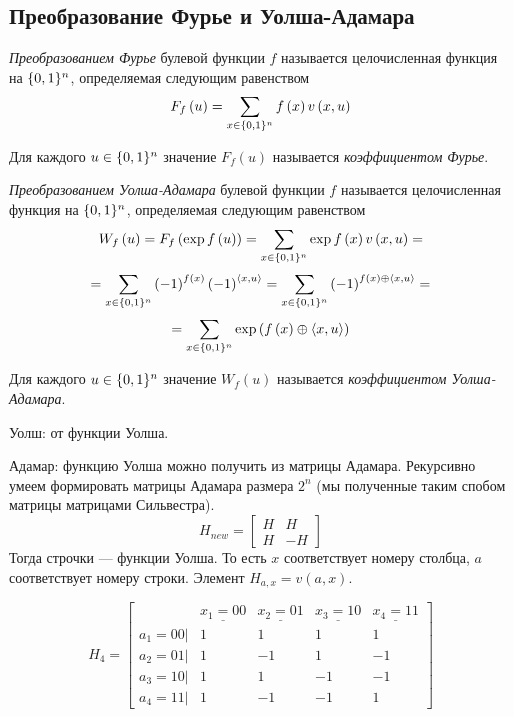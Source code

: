 \subsection{Преобразование Фурье и Уолша-Адамара}
\begin{definition}
\emph{Преобразованием Фурье} булевой функции $f$ называется целочисленная
функция на $\{0,1\}^n$, определяемая следующим равенством
\[
F_{f}\left(u\right)=\sum_{x\in \{0,1\}^n}f\left(x\right)v\left(x,u\right)
\]


Для каждого $u\in \{0,1\}^n$ значение $F_{f}\left(u\right)$ называется
\emph{коэффициентом Фурье}.
\end{definition}

\begin{definition}
\emph{Преобразованием Уолша-Адамара} булевой функции $f$ называется
целочисленная функция на $\{0,1\}^n$, определяемая следующим равенством
\[
W_{f}\left(u\right)=F_{f}\left(\exp f\left(u\right)\right)=\sum_{x\in \{0,1\}^n}\exp f\left(x\right)v\left(x,u\right)=
\]
\[
=\sum_{x\in \{0,1\}^n}\left(-1\right)^{f\left(x\right)}\left(-1\right)^{\left\langle x,u\right\rangle }=\sum_{x\in \{0,1\}^n}\left(-1\right)^{f\left(x\right)\oplus\left\langle x,u\right\rangle }=
\]
\[
=\sum_{x\in \{0,1\}^n}\exp\left(f\left(x\right)\oplus\left\langle x,u\right\rangle \right)
\]


Для каждого $u\in \{0,1\}^n$ значение $W_{f}\left(u\right)$ называется
\emph{коэффициентом Уолша-Адамара}.\end{definition}

Уолш: от функции Уолша.

Адамар: функцию Уолша можно получить из матрицы Адамара. Рекурсивно
умеем формировать матрицы Адамара размера $2^{n}$ (мы полученные
таким спобом матрицы матрицами Сильвестра). 
\[
H_{new}=\left[\begin{array}{cc}
H & H\\
H & -H
\end{array}\right]
\]
Тогда строчки --- функции Уолша. То есть $x$ соответствует номеру
столбца, $a$ соответствует номеру строки. Элемент $H_{a,x}=v\left(a,x\right)$.
\begin{example}
\[
H_{4}=\left[\begin{array}{ccccc}
 & \underline{x_{1}=00} & \underline{x_{2}=01} & \underline{x_{3}=10} & \underline{x_{4}=11}\\
a_{1}=00| & 1 & 1 & 1 & 1\\
a_{2}=01| & 1 & -1 & 1 & -1\\
a_{3}=10| & 1 & 1 & -1 & -1\\
a_{4}=11| & 1 & -1 & -1 & 1
\end{array}\right]
\]


\end{example}

